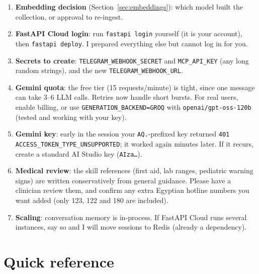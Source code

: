 \documentclass[11pt,a4paper]{article}
\newcommand{\code}[1]{\texttt{#1}}
\begin{document}
\begin{action}[Requests]
\begin{enumerate}
  \item \textbf{Embedding decision} (Section~\ref{sec:embeddings}): which model built the collection, or approval to re-ingest.
  \item \textbf{FastAPI Cloud login}: run \code{fastapi login} yourself (it is your account), then \code{fastapi deploy}. I prepared everything else but cannot log in for you.
  \item \textbf{Secrets to create}: \code{TELEGRAM\_WEBHOOK\_SECRET} and \code{MCP\_API\_KEY} (any long random strings), and the new \code{TELEGRAM\_WEBHOOK\_URL}.
  \item \textbf{Gemini quota}: the free tier (15 requests/minute) is tight, since one message can take 3--6 LLM calls. Retries now handle short bursts. For real users, enable billing, or use \code{GENERATION\_BACKEND=GROQ} with \code{openai/gpt-oss-120b} (tested and working with your key).
  \item \textbf{Gemini key}: early in the session your \code{AQ.}-prefixed key returned \code{401 ACCESS\_TOKEN\_TYPE\_UNSUPPORTED}; it worked again minutes later. If it recurs, create a standard AI Studio key (\code{AIza\ldots}).
  \item \textbf{Medical review}: the skill references (first aid, lab ranges, pediatric warning signs) are written conservatively from general guidance. Please have a clinician review them, and confirm any extra Egyptian hotline numbers you want added (only 123, 122 and 180 are included).
  \item \textbf{Scaling}: conversation memory is in-process. If FastAPI Cloud runs several instances, say so and I will move sessions to Redis (already a dependency).
\end{enumerate}
\end{action}

\appendix
\section{Quick reference}
\end{document}
